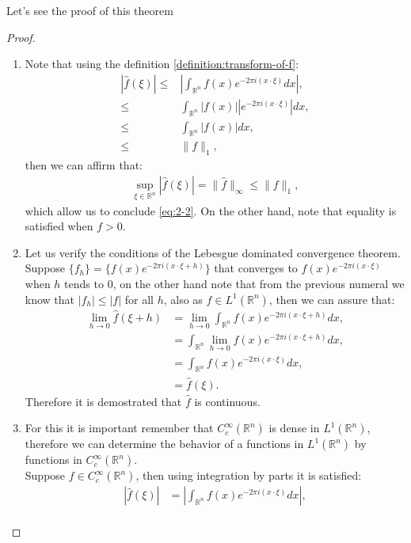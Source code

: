 Let's see the proof of this theorem
\begin{proof} 
	\begin{enumerate}
    \item Note that using the definition \cref{definition:transform-of-f}:
			\begin{align*}
				|\hat{f}(\xi)|\leq& |\int_{\mathbb{R}^n}f(x)e^{-2\pi i(x\cdot \xi)}dx|,\\
				\leq& \int_{\mathbb{R}^n}|f(x)||e^{-2\pi i(x\cdot \xi)}|dx,\\
				\leq& \int_{\mathbb{R}^n}|f(x)|dx,\\
				\leq& \|f\|_{1},
			\end{align*}
			then we can affirm that:
			\begin{align*}
				\sup_{\xi\in\mathbb{R}^n}|\hat{f}(\xi)|=\|\hat{f}\|_{\infty}\leq\|f\|_{1},
			\end{align*}
      which allow us to conclude \cref{eq:2-2}. On the other hand, note that equality is satisfied when $f>0$.
		\item Let us verify the conditions of the Lebesgue dominated convergence theorem.\\
			Suppose $\{f_{h}\}=\{f(x)e^{-2\pi i (x\cdot \xi + h)}\}$ that converges to $f(x)e^{-2\pi i (x\cdot\xi)}$ when $h$ tends to $0$, on the other hand note that from the previous numeral we know that $|f_{h}|\leq |f|$ for all $h$, also as $f\in L^{1}(\mathbb{R}^n)$, then we can assure that:
			\begin{align*}
				\lim_{h\rightarrow 0}\hat{f}(\xi+h)&=\lim_{h\rightarrow 0}\int_{\mathbb{R}^n}f(x)e^{-2\pi i (x\cdot \xi + h)}dx,\\
				&=\int_{\mathbb{R}^n}\lim_{h\rightarrow 0} f(x)e^{-2\pi i (x\cdot \xi + h)}dx,\\
				&=\int_{\mathbb{R}^n}f(x)e^{-2\pi i (x\cdot\xi)}dx,\\
				&=\hat{f}(\xi).
			\end{align*}
			Therefore it is demostrated that $\hat{f}$ is continuous.
		\item For this it is important remember that $C^{\infty}_{c}(\mathbb{R}^n)$ is dense in $L^{1}(\mathbb{R}^n)$, therefore we can determine the behavior of a functions in $L^{1}(\mathbb{R}^n)$ by functions in $C^{\infty}_{c}(\mathbb{R}^n)$.\\
			Suppose $f\in C^{\infty}_{c}(\mathbb{R}^n)$, then using integration by parts it is satisfied:
			\begin{align*}
				|\hat{f}(\xi)|&=\left| \int_{\mathbb{R}^n}f(x)e^{-2\pi i (x\cdot \xi)}dx \right| ,\\

\end{align*}
\end{enumerate}
\end{proof}
